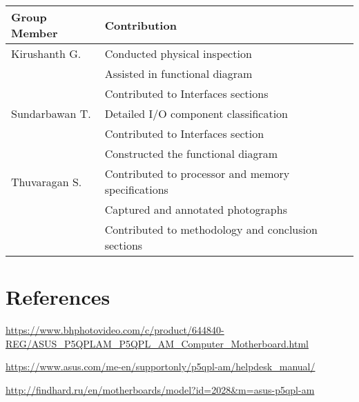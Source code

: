 \begin{table}[H]
\centering
\small
\begin{tabular}{llll}
\toprule \textbf{Group Member}& \textbf{Contribution}\\
\midrule
Kirushanth G. & Conducted physical inspection\\
\space & Assisted in functional diagram\\
\space & Contributed to Interfaces sections\\
Sundarbawan T. & Detailed I/O component classification\\
\space & Contributed to Interfaces section\\
\space & Constructed the functional diagram\\
Thuvaragan S. & Contributed to processor and memory specifications\\
\space & Captured and annotated photographs\\
\space & Contributed to methodology and conclusion sections\\
\bottomrule
\end{tabular}
\end{table}

\section{References}

\url{https://www.bhphotovideo.com/c/product/644840-REG/ASUS_P5QPLAM_P5QPL_AM_Computer_Motherboard.html}

\url{https://www.asus.com/me-en/supportonly/p5qpl-am/helpdesk_manual/}

\url{http://findhard.ru/en/motherboards/model?id=2028&m=asus-p5qpl-am}
